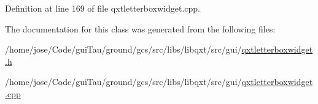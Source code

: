 Definition at line 169 of file qxtletterboxwidget.\-cpp.



The documentation for this class was generated from the following files\-:\begin{DoxyCompactItemize}
\item 
/home/jose/\-Code/gui\-Tau/ground/gcs/src/libs/libqxt/src/gui/\hyperlink{qxtletterboxwidget_8h}{qxtletterboxwidget.\-h}\item 
/home/jose/\-Code/gui\-Tau/ground/gcs/src/libs/libqxt/src/gui/\hyperlink{qxtletterboxwidget_8cpp}{qxtletterboxwidget.\-cpp}\end{DoxyCompactItemize}
